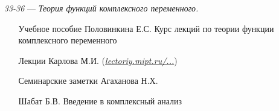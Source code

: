 \begin{itemize}
\item[\textit{33-36}]
\; --- \: \textit{Теория функций комплексного переменного.}
\begin{itemize}
\item[\textbullet]
Учебное пособие Половинкина Е.С. \glqq Курс лекций по теории функции комплексного переменного\grqq
\item[\textbullet] 
Лекции Карлова М.И. (\href{http://lectoriy.mipt.ru/course/Maths-ComplexAnalysis-13L}{\textit{lectoriy.mipt.ru/...}})
\item[\textbullet] 
Семинарские заметки Агаханова Н.Х.
\item[\textbullet] 
Шабат Б.В. \glqq Введение в комплексный анализ\grqq
\end{itemize}
\end{itemize}
